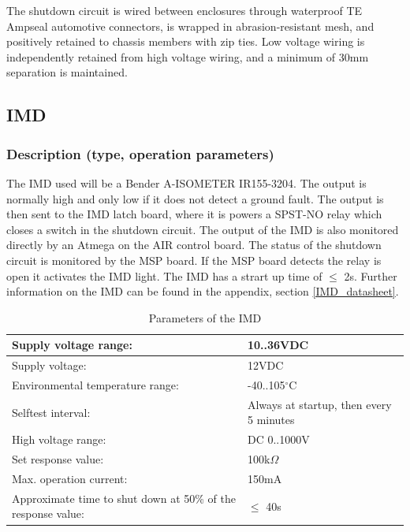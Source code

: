 \documentclass{article}
\begin{document}
The shutdown circuit is wired between enclosures through waterproof TE Ampseal automotive connectors, is wrapped in abrasion-resistant mesh, and positively retained to chassis members with zip ties. Low voltage wiring is independently retained from high voltage wiring, and a minimum of 30mm separation is maintained. 


\subsection{IMD}\label{imd}
\subsubsection{Description (type, operation parameters)}%
The IMD used will be a Bender A-ISOMETER IR155-3204. The output is normally high and only low if it does not detect a ground fault. The output is then sent to the IMD latch board, where it is powers a SPST-NO relay which closes a switch in the shutdown circuit. The output of the IMD is also monitored directly by an Atmega on the AIR control board. The status of the shutdown circuit is monitored by the MSP board. If the MSP board detects the relay is  open it activates the IMD light. The IMD has a strart up time of $\leq$ 2s. Further information on the IMD can be found in the appendix, section \ref{IMD_datasheet}.





\begin{center}
	\begin{table}[H]
		\begin{tabular}{|l|l|}
			\hline
			Supply voltage range: &  10..36VDC \\
			\hline
			Supply voltage: &  12VDC\\
			\hline
			Environmental temperature range: &  -40..105$^{\circ}$C \\
			\hline
			Selftest interval: &  Always at startup, then every 5 minutes \\
			\hline
			High voltage range: &  DC 0..1000V \\
			\hline
			Set response value: &  100k$\Omega$ \\
			\hline
			Max. operation current: &  150mA \\
			\hline
			Approximate time to shut down at 50\% of the response value:&  $\leq$ 40s \\
			\hline
		\end{tabular}
		\caption{Parameters of the IMD}
		\label{IMDParameters}
	\end{table}
\end{center}
\end{document}
